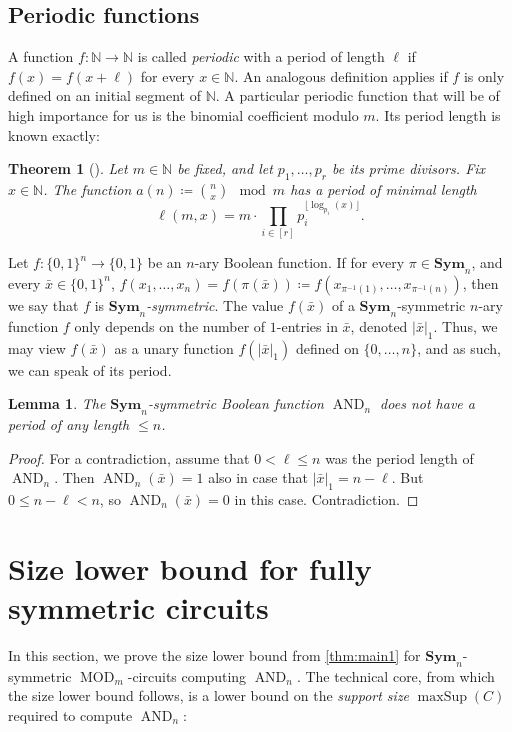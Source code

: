 \documentclass[11pt]{article}
\DeclareMathOperator{\MOD}{MOD}
\DeclareMathOperator{\AND}{AND}
\DeclareMathOperator{\maxSup}{maxSup}
\newcommand{\Sym}{\mathbf{Sym}}
\newcommand{\bbN}{\mathbb{N}}
\theoremstyle{definition}
\theoremstyle{plain}
\newtheorem{lemma}[definition]{Lemma}
\newtheorem{theorem}[definition]{Theorem}
\theoremstyle{remark}
\theoremstyle{remark}
\begin{document}
\subsection{Periodic functions}
\label{sec:periodicity}
A function $f \colon \bbN \to \bbN$ is called \emph{periodic} with a period of length $\ell$ if $f(x) = f(x+ \ell)$ for every $x \in \bbN$. An analogous definition applies if $f$ is only defined on an initial segment of $\bbN$. 
A particular periodic function that will be of high importance for us is the binomial coefficient modulo $m$.
Its period length is known exactly:
\begin{theorem}[{\cite[Theorem 2.3]{laugier2015periodicsequencesmodulom}}]
	\label{thm:binomialPeriod}
	Let $m \in \bbN$ be fixed, and let $p_1, \dots, p_r$ be its prime divisors. Fix $x \in \bbN$. The function $a(n) \coloneqq \binom{n}{x} \mod m$ has a period of minimal length 
	\[
	\ell(m,x) = m \cdot \prod_{i \in [r]} p_i^{\lfloor \log_{p_i}(x) \rfloor}.
	\]
\end{theorem}

Let $f \colon \{0,1\}^n \to \{0,1\}$ be an $n$-ary Boolean function. If for every $\pi \in \Sym_n$, and every $\bar{x} \in \{0,1\}^n$, $f(x_1, \dots, x_n) = f(\pi(\bar{x})) \coloneqq f(x_{\pi^{-1}(1)}, \dots, x_{\pi^{-1}(n)})$, then we say that $f$ is \emph{$\Sym_n$-symmetric}. The value $f(\bar{x})$ of a  $\Sym_n$-symmetric $n$-ary function $f$ only depends on the number of $1$-entries in $\bar{x}$, denoted $|\bar{x}|_1$. Thus, we may view $f(\bar{x})$ as a unary function $f(|\bar{x}|_1)$ defined on $\{0, \dots, n\}$, and as such, we can speak of its period. 

\begin{lemma}
	\label{lem:ANDnotPeriodic}
	The $\Sym_n$-symmetric Boolean function $\AND_n$ does not have a period of any length $\leq n$.
\end{lemma}	 
\begin{proof}
	For a contradiction, assume that $0 < \ell \leq n$ was the period length of $\AND_n$. Then $\AND_n(\bar{x}) = 1$ also in case that $|\bar{x}|_1 = n-\ell$. But $0 \leq n-\ell < n$, so $\AND_n(\bar{x}) = 0$ in this case. Contradiction.
\end{proof}	









\section{Size lower bound for fully symmetric circuits}
In this section, we prove the size lower bound from \cref{thm:main1} for $\Sym_n$-symmetric $\MOD_m$-circuits computing $\AND_n$. The technical core, from which the size lower bound follows, is a lower bound on the \emph{support size} $\maxSup(C)$ required to compute $\AND_n$:
\end{document}
